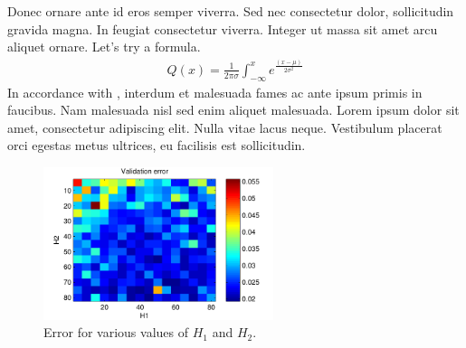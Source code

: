 \documentclass[12pt,paper=a4,pagesize,abstracton]{scrartcl}
\begin{document}
Donec ornare ante id eros semper viverra. Sed nec consectetur dolor,
sollicitudin gravida magna. In feugiat consectetur viverra. Integer ut massa sit
amet arcu aliquet ornare. Let's try a formula.
\begin{align*}
Q(x) = \frac{1}{2 \pi \sigma} \int_{- \infty}^{x} e^{\tfrac{(x - \mu)}{2
\sigma^2}}
\end{align*}
In accordance with \citet[p.~185]{seeger2013pattern}, interdum et malesuada
fames ac ante ipsum primis in faucibus. Nam malesuada nisl sed enim aliquet
malesuada.  Lorem ipsum dolor sit amet, consectetur adipiscing elit. Nulla vitae
lacus neque. Vestibulum placerat orci egestas metus ultrices, eu facilisis est
sollicitudin.

\begin{figure}[ht]
  \centering
  \includegraphics[width=0.6\textwidth]{fig.pdf}
  \caption{Error for various values of $H_1$ and $H_2$.}
  \label{fig:example}
\end{figure}


\end{document}
